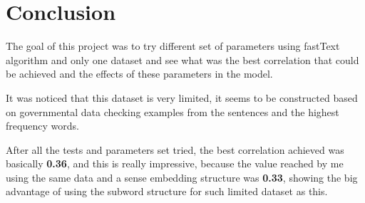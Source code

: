 \documentclass[11pt,oneside,a4paper]{article}
\begin{document}

\section{Conclusion}

The goal of this project was to try different set of parameters using fastText algorithm and only one dataset and see what was the best correlation that could be achieved and the effects of these parameters in the model.

It was noticed that this dataset is very limited, it seems to be constructed based on governmental data checking examples from the sentences and the highest frequency words.

After all the tests and parameters set tried, the best correlation achieved was basically \textbf{0.36}, and this is really impressive, because the value reached by me using the same data and a sense embedding structure was \textbf{0.33}, showing the big advantage of using the subword structure for such limited dataset as this.


\clearpage



\end{document}
